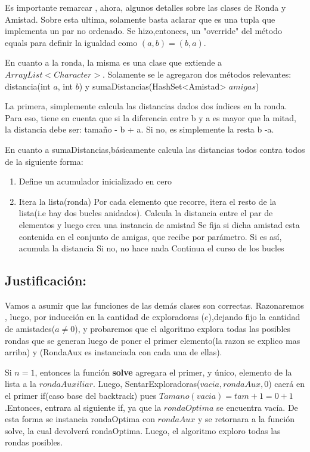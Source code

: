 \documentclass[10pt, a4paper]{article}
\begin{document}
Es importante remarcar , ahora, algunos detalles sobre las clases de Ronda y Amistad.
Sobre esta ultima, solamente basta aclarar que es una tupla que implementa un par no ordenado. Se hizo,entonces, un "override" del método equals para definir la igualdad como $(a,b) = (b,a).$

En cuanto a la ronda, la misma es una clase que extiende a $ArrayList<Character>$. Solamente se le agregaron dos métodos relevantes:
distancia(int $a$, int $b$) y sumaDistancias(HashSet<Amistad> $amigas$)

La primera, simplemente calcula las distancias dados dos índices en la ronda. Para eso, tiene en cuenta que si la diferencia entre b y a es mayor que la mitad, la distancia debe ser: tamaño - b + a. Si no, es simplemente la resta b -a.

En cuanto a sumaDistancias,básicamente calcula las distancias todos contra todos de la siguiente forma:

\begin{enumerate}
 \item Define un acumulador inicializado en cero
\item Itera la lista(ronda)
	\subitem Por cada elemento que recorre, itera el resto de la lista(i.e hay dos bucles anidados).
	\subitem Calcula la distancia entre el par de elementos y luego crea una instancia de amistad
	\subitem Se fija si dicha amistad esta contenida en el conjunto de amigas, que recibe por parámetro.
		\subitem \hspace{6mm} Si es así, acumula la distancia
		\subitem \hspace{6mm} Si no, no hace nada
	\subitem Continua el curso de los bucles
\end{enumerate}


\subsection{Justificación:}

Vamos a asumir que las funciones de las demás clases son correctas. Razonaremos , luego, por inducción en la cantidad de exploradoras ($e$),dejando fijo la cantidad de amistades($a \neq 0$), y probaremos que el algoritmo explora todas las posibles rondas que se generan luego de poner el primer elemento(la razon se explico mas arriba) y (RondaAux es instanciada con cada una de ellas).

Si $n = 1$, entonces la función \textbf{solve} agregara el primer, y único, elemento de la lista a la $rondaAuxiliar$. Luego, SentarExploradoras($vacia,rondaAux,0$) caerá en el primer if(caso base del backtrack) pues $Tamano(vacia) = tam+1 = 0 +1$.Entonces, entrara al siguiente if, ya que la $rondaOptima$ se encuentra vacía. De esta forma se instancia rondaOptima con $rondaAux$ y se retornara a la función solve, la cual devolverá rondaOptima. Luego, el algoritmo exploro todas las rondas posibles.
\end{document}
